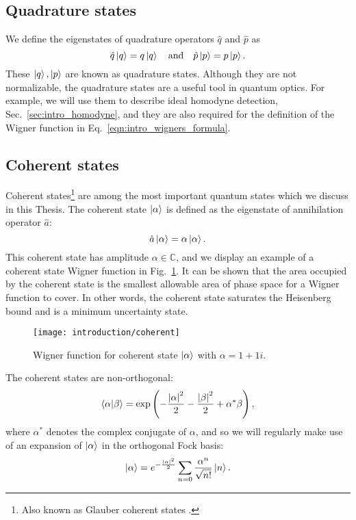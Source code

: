 \FloatBarrier
\subsection{Quadrature states}
We define the eigenstates of quadrature operators $\hat{q}$ and $\hat{p}$ as
\begin{equation}\label{eqn:intro_quadrature_state}
\hat{q}\ket{q} = q \ket{q} \qq{and} \hat{p}\ket{p} = p \ket{p}.
\end{equation}
These $\ket{q}, \ket{p}$ are known as quadrature states. Although they are not normalizable, the quadrature states are a useful tool in quantum optics. For example, we will use them to describe ideal homodyne detection, Sec.~\ref{sec:intro_homodyne}, and they are also required for the definition of the Wigner function in Eq.~\ref{eqn:intro_wigners_formula}.


\FloatBarrier
\subsection{Coherent states}
Coherent states\footnote{Also known as Glauber coherent states \cite{Glauber1963}.} are among the most important quantum states which we discuss in this Thesis. The coherent state $\ket{\alpha}$ is defined as the eigenstate of annihilation operator $\hat{a}$:
\begin{equation}
\hat{a}\ket{\alpha} = \alpha \ket{\alpha}.
\end{equation}
This coherent state has amplitude $\alpha \in \mathbb{C}$, and we display an example of a coherent state Wigner function in Fig.~\ref{fig:intro_coherent_wigner}. It can be shown that the area occupied by the coherent state is the smallest allowable area of phase space for a Wigner function to cover. In other words, the coherent state saturates the Heisenberg bound and is a minimum uncertainty state.%

\begin{figure}[htp]
\centering
\captionsetup{width=0.8\linewidth}
\texttt{[image: introduction/coherent]}
\caption{\label{fig:intro_coherent_wigner} Wigner function for coherent state $\ket{\alpha}$ with $\alpha = 1 + 1i$.}
\end{figure}

\noindent The coherent states are non-orthogonal:
\begin{equation}
\ip{\alpha}{\beta} = \exp\left(- \frac{\left|\alpha\right|^2}{2} - \frac{\left|\beta\right|^2}{2} + \alpha^* \beta \right),
\end{equation}
where $\alpha^*$ denotes the complex conjugate of $\alpha$, and so we will regularly make use of an expansion of $\ket{\alpha}$ in the orthogonal Fock basis:
\begin{equation}\label{eqn:intro_coherent_fock}
\ket{\alpha} = e^{-\frac{\left|\alpha\right|^2}{2}} \sum_{n=0} \frac{\alpha^n}{\sqrt{n!}} \ket{n}.
\end{equation}

